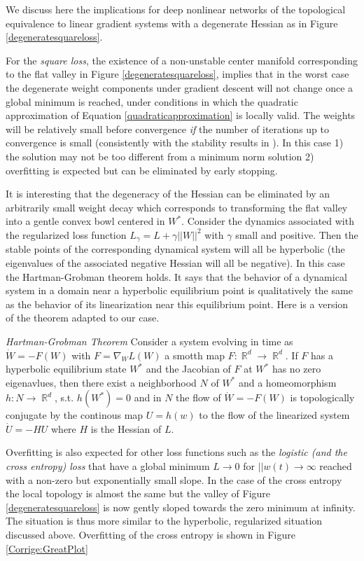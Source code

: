 \documentclass[10pt]{article}
\DeclareMathOperator{\R}{\mathbb{R}}
\begin{document}
We discuss here the implications for deep nonlinear networks of the
topological equivalence to linear gradient systems with a degenerate
Hessian as in Figure \ref{degeneratesquareloss}.


For the {\it square loss}, the existence of a non-unstable center
manifold corresponding to the flat valley in Figure
\ref{degeneratesquareloss}, implies that in the worst case the
degenerate weight components under gradient descent will not change
once a global minimum is reached, under conditions in which the
quadratic approximation of Equation \ref{quadraticapproximation} is
locally valid. The weights will be relatively small before convergence
{\it if} the number of iterations up to convergence is small
(consistently with the stability results in
\cite{hardt_train_2015}). In this case 1) the solution may not be too
different from a minimum norm solution 2) overfitting is expected but
can be eliminated by early stopping.

It is interesting that the degeneracy of the Hessian can be eliminated
by an arbitrarily small weight decay which corresponds to transforming
the flat valley into a gentle convex bowl centered in $W^*$.  Consider the dynamics
associated with the regularized loss function
$L_{\gamma}=L+ \gamma ||W||^2$ with $\gamma$ small and positive. Then
the stable points of the corresponding dynamical system will all be
hyperbolic (the eigenvalues of the associated negative Hessian will
all be negative). In this case the Hartman-Grobman
theorem\cite{Wanner2000} holds. It says that the behavior of a
dynamical system in a domain near a hyperbolic equilibrium point is
qualitatively the same as the behavior of its linearization near this
equilibrium point. Here is a version of the theorem adapted to our
case.

 {\it Hartman-Grobman Theorem}  Consider a system evolving in time as $\dot{W} = - F(W)$ with
  $F=\nabla_{W} L(W)$ a smotth map $F: \R^d \to \R^d$. If $F$ has a hyperbolic
  equilibrium state $W^*$ and the Jacobian of $F$ at $W^*$ has no zero
  eigenavlues, then there exist a neighborhood $N$ of $W^*$ and a
  homeomorphism $h: N \to \R^d$, s.t. $h(W^*) =0$ and in $N$ the flow
  of $\dot{W} = - F(W)$ is topologically conjugate by the continous
  map $U=h(w)$ to the flow of  the linearized system $\dot{U}=-HU$
  where $H$ is the Hessian of $L$.

Overfitting is also expected for other loss functions such as the {\it
  logistic (and the cross entropy) loss} that have a global minimum
$L \to 0$ for $||w(t) \to \infty$ reached with a non-zero but
exponentially small slope. In the case of the cross entropy the local
topology is almost the same but the valley of Figure
\ref{degeneratesquareloss} is now gently sloped towards the zero
minimum at infinity.  The situation is thus more similar to the
hyperbolic, regularized situation discussed above. Overfitting of the cross
entropy is shown in Figure \ref{Corrige:GreatPlot}
\end{document}
